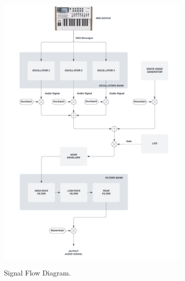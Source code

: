 \documentclass{article}
\begin{document}
\begin{figure}
{\includegraphics[width=9.35cm]{Signal Flow Diagram.png}}\par
    \caption{Signal Flow Diagram.}
\end{figure}
\end{document}
